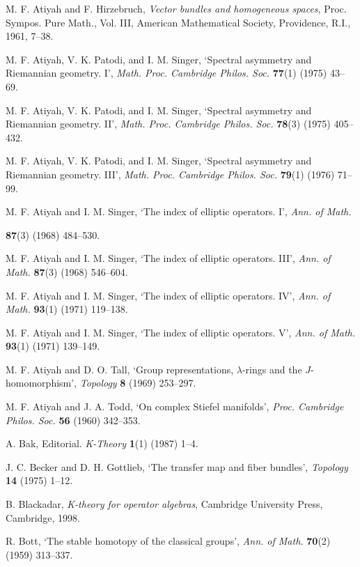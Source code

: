 \noindent [20] M. F. Atiyah and F. Hirzebruch, \textit{Vector bundles and homogeneous spaces}, Proc. Sympos. Pure Math., Vol. III, American Mathematical Society, Providence, R.I., 1961, 7--38.

\noindent [21] M. F. Atiyah, V. K. Patodi, and I. M. Singer, `Spectral asymmetry and Riemannian geometry. I', \textit{Math. Proc. Cambridge Philos. Soc.} \textbf{77}(1) (1975) 43--69.

\noindent [22] M. F. Atiyah, V. K. Patodi, and I. M. Singer, `Spectral asymmetry and Riemannian geometry. II', \textit{Math. Proc. Cambridge Philos. Soc.} \textbf{78}(3) (1975) 405--432.

\noindent [23] M. F. Atiyah, V. K. Patodi, and I. M. Singer, `Spectral asymmetry and Riemannian geometry. III', \textit{Math. Proc. Cambridge Philos. Soc.} \textbf{79}(1) (1976) 71--99.

\noindent [24] M. F. Atiyah and I. M. Singer, `The index of elliptic operators. I', \textit{Ann. of Math.}

\noindent \textbf{87}(3) (1968) 484--530.

\noindent [25] M. F. Atiyah and I. M. Singer, `The index of elliptic operators. III', \textit{Ann. of Math.} \textbf{87}(3) (1968) 546--604.

\noindent [26] M. F. Atiyah and I. M. Singer, `The index of elliptic operators. IV', \textit{Ann. of Math.} \textbf{93}(1) (1971) 119--138.

\noindent [27] M. F. Atiyah and I. M. Singer, `The index of elliptic operators. V', \textit{Ann. of Math.} \textbf{93}(1) (1971) 139--149.

\noindent [28] M. F. Atiyah and D. O. Tall, `Group representations, $\lambda$-rings and the $J$-homomorphism', \textit{Topology} \textbf{8} (1969) 253--297.

\noindent [29] M. F. Atiyah and J. A. Todd, `On complex Stiefel manifolds', \textit{Proc. Cambridge Philos. Soc.} \textbf{56} (1960) 342--353.

\noindent [30] A. Bak, Editorial. \textit{K-Theory} \textbf{1}(1) (1987) 1--4.

\noindent [31] J. C. Becker and D. H. Gottlieb, `The transfer map and fiber bundles', \textit{Topology} \textbf{14} (1975) 1--12.

\noindent [32] B. Blackadar, \textit{K-theory for operator algebras}, Cambridge University Press, Cambridge, 1998.

\noindent [33] R. Bott, `The stable homotopy of the classical groups', \textit{Ann. of Math.} \textbf{70}(2) (1959) 313--337.

